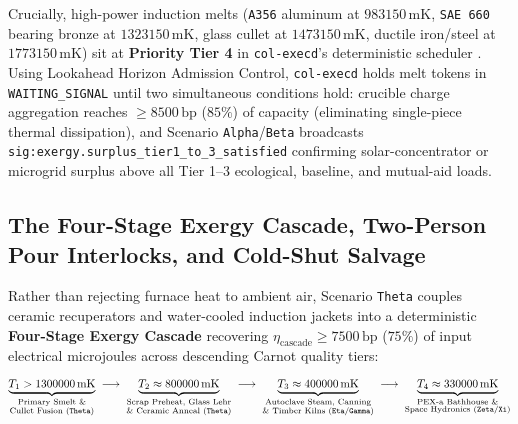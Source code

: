 Crucially, high-power induction melts (\texttt{A356} aluminum at $983150\,\mathrm{mK}$, \texttt{SAE 660} bearing bronze at
$1323150\,\mathrm{mK}$, glass cullet at $1473150\,\mathrm{mK}$, ductile iron/steel at $1773150\,\mathrm{mK}$) sit at \textbf{Priority Tier 4} in
\texttt{col-execd}'s deterministic scheduler \parencite{liu1973scheduling}. Using Lookahead Horizon Admission Control, \texttt{col-execd} holds
melt tokens in \texttt{WAITING\_SIGNAL} until two simultaneous conditions hold: crucible charge aggregation reaches $\ge 8500\,\mathrm{bp}$
($85\%$) of capacity (eliminating single-piece thermal dissipation), and Scenario \texttt{Alpha}/\texttt{Beta} broadcasts
\texttt{sig:exergy.surplus\_tier1\_to\_3\_satisfied} confirming solar-concentrator or microgrid surplus above all Tier 1--3 ecological, baseline,
and mutual-aid loads.

\subsection{The Four-Stage Exergy Cascade, Two-Person Pour Interlocks, and Cold-Shut Salvage}

Rather than rejecting furnace heat to ambient air, Scenario \texttt{Theta} couples ceramic recuperators and water-cooled induction jackets into a
deterministic \textbf{Four-Stage Exergy Cascade} recovering $\eta_{\mathrm{cascade}} \ge 7500\,\mathrm{bp}$ ($75\%$) of input electrical
microjoules across descending Carnot quality tiers:
\begin{equation}
\underbrace{T_1 > 1300000\,\mathrm{mK}}_{\substack{\text{Primary Smelt \&}\\ \text{Cullet Fusion (\texttt{Theta})}}} \;\longrightarrow\;
\underbrace{T_2 \approx 800000\,\mathrm{mK}}_{\substack{\text{Scrap Preheat, Glass Lehr}\\ \text{\& Ceramic Anneal (\texttt{Theta})}}} \;\longrightarrow\;
\underbrace{T_3 \approx 400000\,\mathrm{mK}}_{\substack{\text{Autoclave Steam, Canning}\\ \text{\& Timber Kilns (\texttt{Eta}/\texttt{Gamma})}}} \;\longrightarrow\;
\underbrace{T_4 \approx 330000\,\mathrm{mK}}_{\substack{\text{PEX-a Bathhouse \&}\\ \text{Space Hydronics (\texttt{Zeta}/\texttt{Xi})}}}
\label{eq:four-stage-cascade}
\end{equation}

